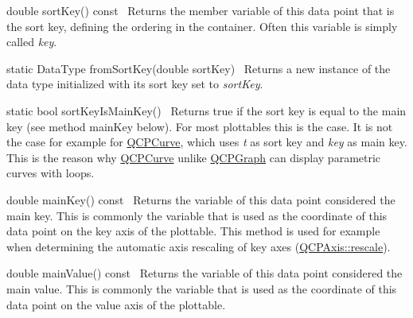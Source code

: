 \begin{DoxyItemize}
\item {\ttfamily double sort\+Key() const}~\newline
 Returns the member variable of this data point that is the sort key, defining the ordering in the container. Often this variable is simply called {\itshape key}.\end{DoxyItemize}
\begin{DoxyItemize}
\item {\ttfamily static Data\+Type from\+Sort\+Key(double sort\+Key)}~\newline
 Returns a new instance of the data type initialized with its sort key set to {\itshape sort\+Key}.\end{DoxyItemize}
\begin{DoxyItemize}
\item {\ttfamily static bool sort\+Key\+Is\+Main\+Key()}~\newline
 Returns true if the sort key is equal to the main key (see method {\ttfamily main\+Key} below). For most plottables this is the case. It is not the case for example for \hyperlink{class_q_c_p_curve}{Q\+C\+P\+Curve}, which uses {\itshape t} as sort key and {\itshape key} as main key. This is the reason why \hyperlink{class_q_c_p_curve}{Q\+C\+P\+Curve} unlike \hyperlink{class_q_c_p_graph}{Q\+C\+P\+Graph} can display parametric curves with loops.\end{DoxyItemize}
\begin{DoxyItemize}
\item {\ttfamily double main\+Key() const}~\newline
 Returns the variable of this data point considered the main key. This is commonly the variable that is used as the coordinate of this data point on the key axis of the plottable. This method is used for example when determining the automatic axis rescaling of key axes (\hyperlink{class_q_c_p_axis_a499345f02ebce4b23d8ccec96e58daa9}{Q\+C\+P\+Axis\+::rescale}).\end{DoxyItemize}
\begin{DoxyItemize}
\item {\ttfamily double main\+Value() const}~\newline
 Returns the variable of this data point considered the main value. This is commonly the variable that is used as the coordinate of this data point on the value axis of the plottable.\end{DoxyItemize}
